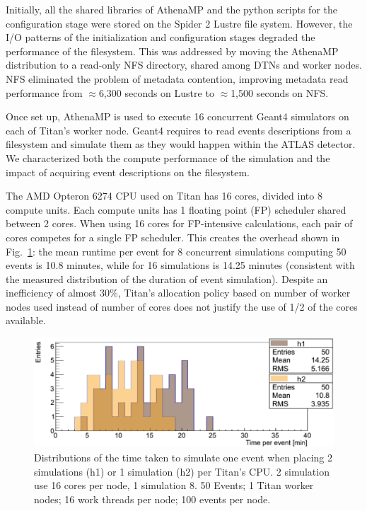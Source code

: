 Initially, all the shared libraries of AthenaMP and the python scripts for the
configuration stage were stored on the Spider 2 Lustre file system. However, the
I/O patterns of the initialization and configuration stages degraded the
performance of the filesystem. This was addressed by moving the AthenaMP
distribution to a read-only NFS directory, shared among DTNs and worker nodes.
NFS eliminated the problem of metadata contention, improving metadata read
performance from $\approx$6,300 seconds on Lustre to $\approx$1,500 seconds on
NFS.

Once set up, AthenaMP is used to execute 16 concurrent Geant4 simulators on each
of Titan's worker node. Geant4 requires to read events descriptions from a
filesystem and simulate them as they would happen within the ATLAS detector. We
characterized both the compute performance of the simulation and the impact of
acquiring event descriptions on the filesystem.

The AMD Opteron 6274 CPU used on Titan has 16 cores, divided into 8 compute
units. Each compute units has 1 floating point (FP) scheduler shared between 2
cores. When using 16 cores for FP-intensive calculations, each pair of cores
competes for a single FP scheduler. This creates the overhead shown in
Fig.~\ref{fig:comparison-8-16cores}: the mean runtime per event for 8
concurrent simulations computing 50 events is 10.8 minutes, while for 16
simulations is 14.25 minutes (consistent with the measured distribution of the
duration of event simulation). Despite an inefficiency of almost 30\%, Titan's
allocation policy based on number of worker nodes used instead of number of
cores does not justify the use of 1/2 of the cores available.

\begin{figure}[htp]
    \includegraphics[clip,width=\columnwidth]{figures/tx8_tx16_comparison_vsquashed.pdf}

    \caption{Distributions of the time taken to simulate one event when placing
    2 simulations (h1) or 1 simulation (h2) per Titan's CPU. 2 simulation use 16
    cores per node, 1 simulation 8. 50 Events; 1 Titan worker nodes; 16 work
    threads per node; 100 events per node.}

\label{fig:comparison-8-16cores}
\end{figure}

